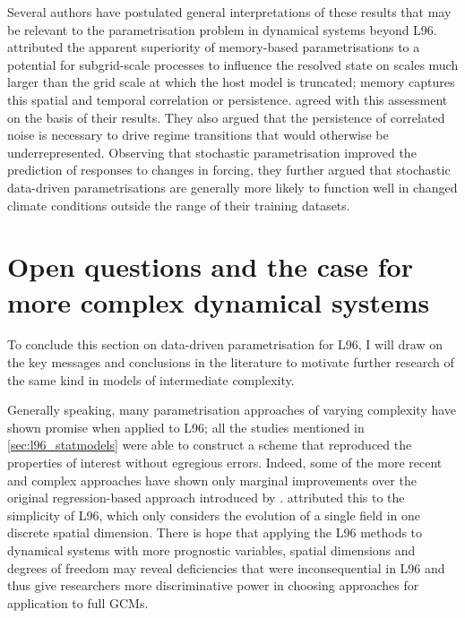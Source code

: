 \documentclass[../main.tex]{subfiles}
\begin{document}
Several authors have postulated general interpretations of these results that
may be relevant to the parametrisation problem in dynamical systems beyond L96.
\textcite{arnold2013} attributed the apparent superiority of memory-based
parametrisations to a potential for subgrid-scale processes to influence the
resolved state on scales much larger than the grid scale at which the host
model is truncated; memory captures this spatial and temporal correlation or
persistence. \textcite{christensen2015} agreed with this assessment on the
basis of their results. They also argued that the persistence of correlated
noise is necessary to drive regime transitions that would otherwise be
underrepresented. Observing that stochastic parametrisation improved the
prediction of responses to changes in forcing, they further argued that
stochastic data-driven parametrisations are generally more likely to function
well in changed climate conditions outside the range of their training
datasets.


\section{Open questions and the case for more complex dynamical systems}
\label{sec:l96_open_questions}
To conclude this section on data-driven parametrisation for L96, I will draw on
the key messages and conclusions in the literature to motivate further research
of the same kind in models of intermediate complexity.

Generally speaking, many parametrisation approaches of varying complexity have
shown promise when applied to L96; all the studies mentioned in
\cref{sec:l96_statmodels} were able to construct a scheme that reproduced the
properties of interest without egregious errors. Indeed, some of the more
recent and complex approaches have shown only marginal improvements over the
original regression-based approach introduced by \textcite{wilks2005}.
\textcite{gagne2020} attributed this to the simplicity of L96, which only
considers the evolution of a single field in one discrete spatial dimension.
There is hope that applying the L96 methods to dynamical systems with more
prognostic variables, spatial dimensions and degrees of freedom may reveal
deficiencies that were inconsequential in L96 and thus give researchers more
discriminative power in choosing approaches for application to full GCMs.
\end{document}
